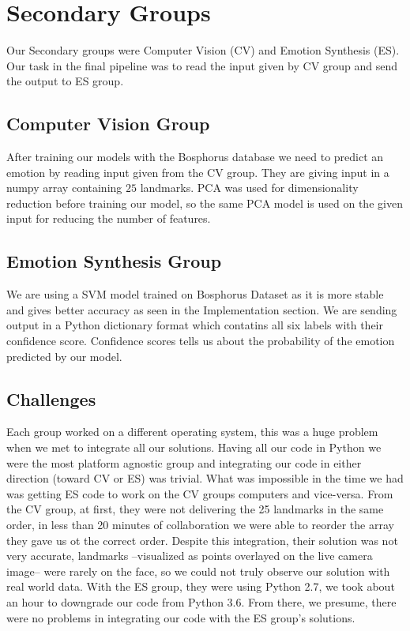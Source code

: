 \section{Secondary Groups}

Our Secondary groups were Computer Vision (CV) and Emotion Synthesis (ES). Our task in the final pipeline was to read the input given by CV group and send the output to ES group.

\subsection{Computer Vision Group}
After training our models with the Bosphorus database we need to predict an emotion by reading input given from the CV group. They are giving input in a numpy array containing $25$ landmarks. PCA was used for dimensionality reduction before training our model, so the same PCA model is used on the given input for reducing the number of features.

\subsection{Emotion Synthesis Group}
We are using a SVM model trained on Bosphorus Dataset as it is more stable and gives better accuracy as seen in the Implementation section. We are sending output in a Python dictionary format which contatins all six labels with their confidence score. Confidence scores tells us about the probability of the emotion predicted by our model. %

\subsection{Challenges}
Each group worked on a different operating system, this was a huge problem when we met to integrate all our solutions. Having all our code in Python we were the most platform agnostic group and integrating our code in either direction (toward CV or ES) was trivial. What was impossible in the time we had was getting ES code to work on the CV groups computers and vice-versa. From the CV group, at first, they were not delivering the 25 landmarks in the same order, in less than 20 minutes of collaboration we were able to reorder the array they gave us ot the correct order. Despite this integration, their solution was not very accurate, landmarks --visualized as points overlayed on the live camera image-- were rarely on the face, so we could not truly observe our solution with real world data. With the ES group, they were using Python 2.7, we took about an hour to downgrade our code from Python 3.6. From there, we presume, there were no problems in integrating our code with the ES group's solutions.
